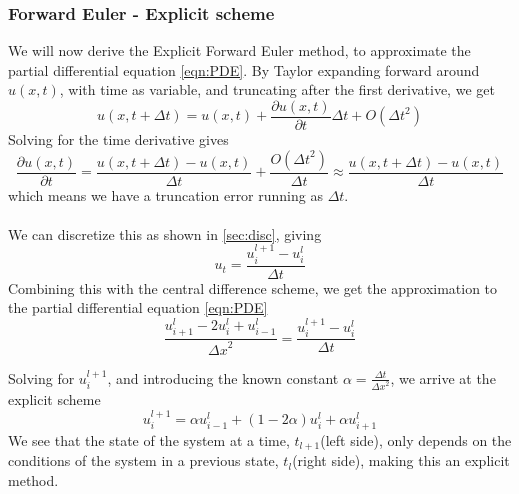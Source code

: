 \documentclass[10pt,a4paper]{article}
\newcommand{\dt}{{\Delta t}}
\newcommand{\dx}{{\Delta x}}
\newcommand{\pt}{{\partial t}}
\newcommand{\pu}{{\partial u}}
\begin{document}
\subsubsection{Forward Euler - Explicit scheme}
We will now derive the Explicit Forward Euler method, to approximate the partial differential equation \ref{eqn:PDE}. By Taylor expanding forward around $u(x,t)$, with time as variable, and truncating after the first derivative, we get
\begin{equation}
u(x,t+\dt) = u(x,t) + \frac{\pu(x,t)}{\pt}\dt + O(\dt^2)
\end{equation}
Solving for the time derivative gives
\begin{equation}
\frac{\pu(x,t)}{\pt} = \frac{u(x,t+\dt) - u(x,t)}{\dt} + \frac{O(\dt^2)}{\dt} \approx \frac{u(x,t+\dt) - u(x,t)}{\dt}
\end{equation}
which means we have a truncation error running as $\dt$.
\\\\
We can discretize this as shown in \ref{sec:disc}, giving
\begin{equation}
u_t = \frac{u_i^{l+1} - u_i^l}{\dt}
\end{equation}
Combining this with the central difference scheme, we get the approximation to the partial differential equation \vref{eqn:PDE}
\begin{equation}
\frac{u_{i+1}^l - 2u_i^l+u_{i-1}^l}{\dx^2} = \frac{u_i^{l+1} - u_i^l}{\dt}
\end{equation}

Solving for $u_i^{l+1}$, and introducing the known constant $\alpha = \frac{\dt}{\dx^2}$, we arrive at the explicit scheme
\begin{equation}
u_i^{l+1} = \alpha u_{i-1}^l + (1-2\alpha)u_i^l + \alpha u_{i+1}^l
\end{equation}
We see that the state of the system at a time, $t_{l+1}$(left side), only depends on the conditions of the system in a previous state, $t_l$(right side), making this an explicit method.
\end{document}
